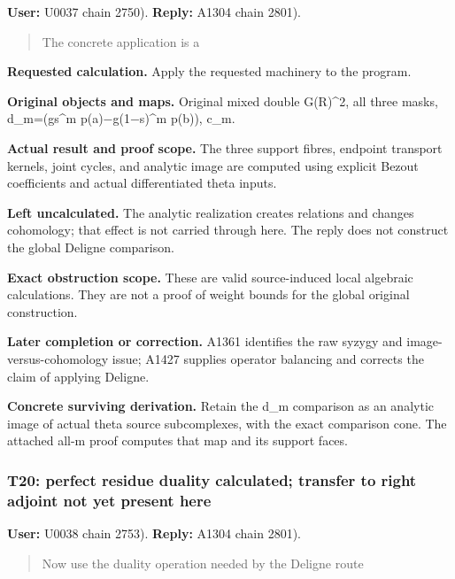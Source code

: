 \documentclass[10pt,a4paper,oneside]{report}
\begin{document}
\textbf{User:} U0037
\protect{} chain 2750).
\textbf{Reply:} A1304
\protect{} chain 2801).

\begin{quote}
The concrete application is a
\end{quote}

\textbf{Requested calculation.} Apply the requested machinery to the
program.

\textbf{Original objects and maps.} Original mixed double G(R)\^{}2, all
three masks, d\_m=(gs\^{}m
p(a)\allowbreak{}\ensuremath{−}\allowbreak{}g(1\allowbreak{}\ensuremath{−}\allowbreak{}s)\textasciicircum{}m
p(b)), c\_m.

\textbf{Actual result and proof scope.} The three support fibres,
endpoint transport kernels, joint cycles, and analytic image are
computed using explicit Bezout coefficients and actual differentiated
theta inputs.

\textbf{Left uncalculated.} The analytic realization creates relations
and changes cohomology; that effect is not carried through here. The
reply does not construct the global Deligne comparison.

\textbf{Exact obstruction scope.} These are valid source-induced local
algebraic calculations. They are not a proof of weight bounds for the
global original construction.

\textbf{Later completion or correction.} A1361 identifies the raw syzygy
and image-versus-cohomology issue; A1427 supplies operator balancing and
corrects the claim of applying Deligne.

\textbf{Concrete surviving derivation.} Retain the d\_m comparison as an
analytic image of actual theta source subcomplexes, with the exact
comparison cone. The attached all-m proof computes that map and its
support faces.

\subsubsection{T20: perfect residue duality calculated; transfer to
right adjoint not yet present
here}\label{t20-perfect-residue-duality-calculated-transfer-to-right-adjoint-not-yet-present-here}

\textbf{User:} U0038
\protect{} chain 2753).
\textbf{Reply:} A1304
\protect{} chain 2801).

\begin{quote}
Now use the duality operation needed by the Deligne route
\end{quote}
\end{document}
